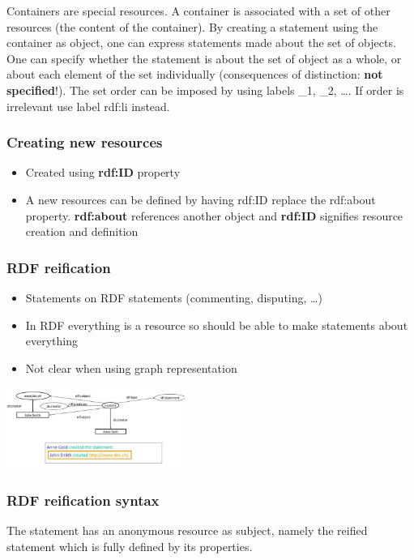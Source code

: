 Containers are special resources. A container is associated with a set
of other resources (the content of the container). By creating a
statement using the container as object, one can express
statements made about the set of objects. One can specify whether the
statement is about the set of object as a whole, or about each element
of the set individually (consequences of distinction: \textbf{not
  specified}!). The set order can be imposed by using labels \_1, \_2,
\ldots. If order is irrelevant use label rdf:li instead.


\subsubsection{Creating new resources}
\begin{itemize}
\item Created using \textbf{rdf:ID} property
\item A new resources can be defined by having rdf:ID replace the
  rdf:about property. \textbf{rdf:about} references another object and
  \textbf{rdf:ID} signifies resource creation and definition
\end{itemize}

\subsubsection{RDF reification}
\begin{itemize}
\item Statements on RDF statements (commenting, disputing, \ldots)
\item In RDF everything is a resource so should be able to make
  statements about everything
\item Not clear when using graph representation
\end{itemize}

\includegraphics[width=220px, height=100px]{reification}

\subsubsection{RDF reification syntax}
The statement has an anonymous resource as subject, namely the reified
statement which is fully defined by its properties.

